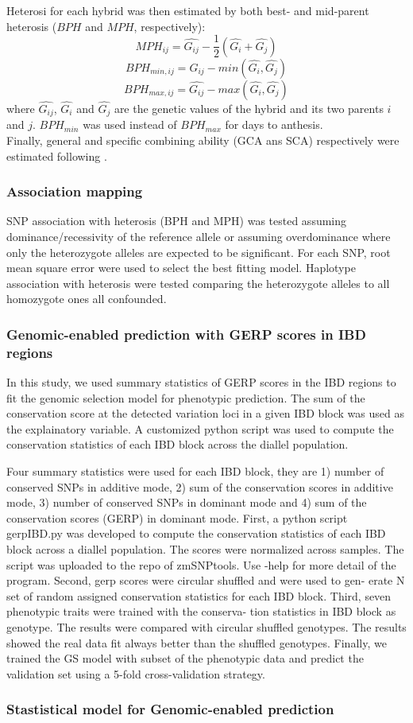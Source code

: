 \documentclass[10pt]{article}
\begin{document}
Heterosi for each hybrid was then estimated by both best- and mid-parent heterosis ($BPH$ and $MPH$, respectively):
%
\[ MPH_{ij}=\hat{G_{ij}}-\frac{1}{2}(\hat{G_{i}}+\hat{G_{j}}) \]
\[ BPH_{min,ij}=\hat{G_{ij}}-min(\hat{G_{i}} ,\hat{G_{j}}) \] 
\[ BPH_{max,ij}=\hat{G_{ij}}-max(\hat{G_{i}} ,\hat{G_{j}}) \]
%
where $\hat{G_{ij}}$, $\hat{G_{i}}$ and $\hat{G_{j}}$ are the genetic values of the hybrid and its two parents $i$ and $j$. $BPH_{min}$ was used instead of $BPH_{max}$ for days to anthesis.\\

Finally, general and specific combining ability (GCA ans SCA) respectively were estimated following \citet{Falconer1996}.

\subsubsection*{Association mapping}
SNP association with heterosis (BPH and MPH) was tested assuming dominance/recessivity of the reference allele or assuming overdominance where only the heterozygote alleles are expected to be significant. For each SNP, root mean square error were used to select the best fitting model. 
Haplotype association with heterosis were tested comparing the heterozygote alleles to all homozygote ones all confounded. 


\subsubsection*{Genomic-enabled prediction with GERP scores in IBD regions}

In this study, we used summary statistics of GERP scores in the IBD regions to fit the genomic selection model for phenotypic prediction. The sum of the conservation score at the detected variation loci in a given IBD block was used as the explainatory variable. A customized python script was used to compute the conservation statistics of each IBD block across the diallel population.



Four summary statistics were used for each IBD block, they are 1) number of conserved SNPs in additive mode, 2) sum of the conservation scores in additive mode, 3) number of conserved SNPs in dominant mode and 4) sum of the conservation scores (GERP) in dominant mode.
First, a python script gerpIBD.py was developed to compute the conservation statistics of each IBD block across a diallel population. The scores were normalized across samples. The script was uploaded to the repo of zmSNPtools. Use -help for more detail of the program.
Second, gerp scores were circular shuffled and were used to gen- erate N set of random assigned conservation statistics for each IBD block.
Third, seven phenotypic traits were trained with the conserva- tion statistics in IBD block as genotype. The results were compared with circular shuffled genotypes. The results showed the real data fit always better than the shuffled genotypes.
Finally, we trained the GS model with subset of the phenotypic data and predict the validation set using a 5-fold cross-validation strategy.

\subsubsection*{Stastistical model for Genomic-enabled prediction}

\clearpage

\end{document}

